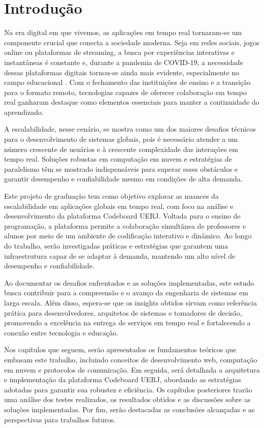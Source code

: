 \chapter*{Introdução}

Na era digital em que vivemos, as aplicações em tempo real tornaram-se um componente crucial que conecta a sociedade moderna. Seja em redes sociais, jogos online ou plataformas
de streaming, a busca por experiências interativas e instantâneas é constante e, durante a pandemia de COVID-19, a necessidade dessas plataformas digitais tornou-se ainda mais evidente, especialmente no campo educacional \cite{impact-covid19-teaching-learning}. Com o fechamento das instituições de ensino e a transição para o formato remoto, tecnologias capazes de oferecer colaboração em tempo real ganharam destaque como elementos essenciais para manter a continuidade do aprendizado.

A escalabilidade, nesse cenário, se mostra como um dos maiores desafios técnicos para o desenvolvimento de sistemas globais, pois é necessário atender a um número crescente de usuários e à crescente complexidade das interações em tempo real. Soluções robustas em computação em nuvem e estratégias de paralelismo têm se mostrado indispensáveis para superar esses obstáculos e garantir desempenho e confiabilidade mesmo em condições de alta demanda.

Este projeto de graduação tem como objetivo explorar as nuances da escalabilidade em aplicações globais em tempo real, com foco na análise e desenvolvimento da plataforma Codeboard UERJ. Voltada para o ensino de programação, a plataforma permite a colaboração simultânea de professores e alunos por meio de um ambiente de codificação interativo e dinâmico. Ao longo do trabalho, serão investigadas práticas e estratégias que garantem uma infraestrutura capaz de se adaptar à demanda, mantendo um alto nível de desempenho e confiabilidade.

Ao documentar os desafios enfrentados e as soluções implementadas, este estudo busca contribuir para a compreensão e o avanço da engenharia de sistemas em larga escala. Além disso, espera-se que os insights obtidos sirvam como referência prática para desenvolvedores, arquitetos de sistemas e tomadores de decisão, promovendo a excelência na entrega de serviços em tempo real e fortalecendo a conexão entre tecnologia e educação.

Nos capítulos que seguem, serão apresentados os fundamentos teóricos que embasam este trabalho, incluindo conceitos de desenvolvimento web, computação em nuvem e protocolos de comunicação. Em seguida, será detalhada a arquitetura e implementação da plataforma Codeboard UERJ, abordando as estratégias adotadas para garantir sua robustez e eficiência. Os capítulos posteriores trarão uma análise dos testes realizados, os resultados obtidos e as discussões sobre as soluções implementadas. Por fim, serão destacadas as conclusões alcançadas e as perspectivas para trabalhos futuros.